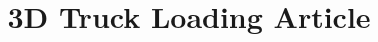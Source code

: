 \documentclass{article}
\begin{document}
\title{3D Truck Loading Article}
\maketitle

\printbibliography
\end{document}
